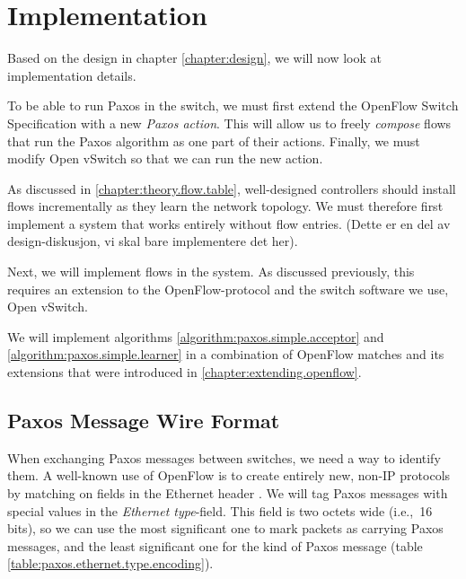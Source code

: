 \chapter{Implementation}
\label{chapter:implementation}

Based on the design in chapter \ref{chapter:design}, we will now look at
implementation details.

To be able to run Paxos in the switch, we must first extend the OpenFlow
Switch Specification with a new \textit{Paxos action}.
%
%
%
This will allow us to freely \textit{compose} flows that run the
Paxos algorithm as one part of their actions.
%
Finally, we must modify Open vSwitch so that we can run the new action.



As discussed in \vref{chapter:theory.flow.table}, well-designed controllers
should install flows incrementally as they learn the network topology.
%
We must therefore first implement a system that works entirely without flow
entries. (Dette er en del av design-diskusjon, vi skal bare implementere det
her).

Next, we will implement flows in the system. As discussed previously, this
requires an extension to the OpenFlow-protocol and the switch software we
use, Open vSwitch.

\label{implementation.simplified.paxos}

We will implement algorithms \ref{algorithm:paxos.simple.acceptor} 
and \ref{algorithm:paxos.simple.learner} in a combination of OpenFlow
matches and its extensions that were introduced
in \vref{chapter:extending.openflow}.



\section{Paxos Message Wire Format}

When exchanging Paxos messages between switches, we need a way to identify
them.
%
A well-known use of OpenFlow is to create entirely new, non-IP protocols
by matching on fields in the Ethernet header
\cite[Example 4, p.~73]{McKeown:2008:OEI:1355734.1355746}.
%
We will tag Paxos messages with special values in the \textit{Ethernet
  type}-field.
%
This field is two octets wide (i.e.,~16 bits), so we can use the most
significant one to mark packets as carrying Paxos messages, and the
least significant one for the kind of Paxos message (table
\ref{table:paxos.ethernet.type.encoding}).

